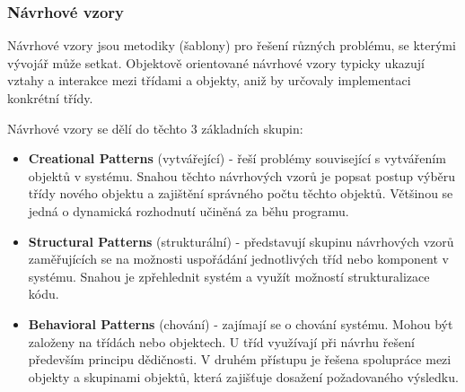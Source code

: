 \documentclass[10pt,a4paper]{article}
\begin{document}
\subsubsection{Návrhové vzory}
Návrhové vzory jsou metodiky (šablony) pro řešení různých problému, se kterými vývojář může setkat. Objektově orientované návrhové vzory typicky ukazují vztahy a interakce mezi třídami a objekty, aniž by určovaly implementaci konkrétní třídy.

Návrhové vzory se dělí do těchto 3 základních skupin:


\begin{itemize}
\item \textbf{Creational Patterns} (vytvářející) - řeší problémy související s vytvářením objektů v systému. Snahou těchto návrhových vzorů je popsat postup výběru třídy nového objektu a zajištění správného počtu těchto objektů. Většinou se jedná o dynamická rozhodnutí učiněná za běhu programu.
\item \textbf{Structural Patterns }(strukturální) - představují skupinu návrhových vzorů zaměřujících se na možnosti uspořádání jednotlivých tříd nebo komponent v systému. Snahou je zpřehlednit systém a využít možností strukturalizace kódu.
\item \textbf{Behavioral Patterns} (chování) - zajímají se o chování systému. Mohou být založeny na třídách nebo objektech. U tříd využívají při návrhu řešení především principu dědičnosti. V druhém přístupu je řešena spolupráce mezi objekty a skupinami objektů, která zajišťuje dosažení požadovaného výsledku.
\end{itemize}
\end{document}
